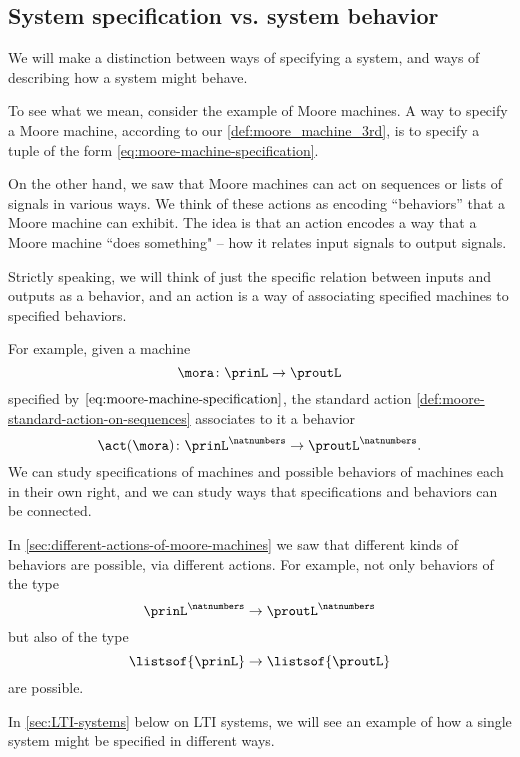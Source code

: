 
\subsection{System specification vs. system behavior}
 
We will make a distinction between ways of specifying a system, and ways of describing how a system might behave. 

To see what we mean, consider the example of Moore machines. A way to specify a Moore machine, according to our \cref{def:moore_machine_3rd}, is to specify a tuple of the form \cref{eq:moore-machine-specification}. 

On the other hand, we saw that Moore machines can act on sequences or lists of signals in various ways. We think of these actions as encoding ``behaviors'' that a Moore machine can exhibit. The idea is that an action encodes a way that a Moore machine ``does something" -- how it relates input signals to output signals. 

Strictly speaking, we will think of just the specific relation between inputs and outputs as a behavior, and an action is a way of associating specified machines to specified behaviors. 


For example, given a machine 
\begin{equation*}
\mora \colon \prinL \to \proutL
\end{equation*}
specified by $\cref{eq:moore-machine-specification}$, the standard action \cref{def:moore-standard-action-on-sequences} associates to it a behavior
\begin{equation*}
    \act(\mora) \colon {\prinL}^\natnumbers \to {\proutL}^\natnumbers.
\end{equation*}
We can study specifications of machines and possible behaviors of machines each in their own right, and we can study ways that specifications and behaviors can be connected. 

In \cref{sec:different-actions-of-moore-machines} we saw that different kinds of behaviors are possible, via different actions. For example, not only behaviors of the type
\begin{equation*}
{\prinL}^\natnumbers \to {\proutL}^\natnumbers
\end{equation*}
but also of the type
\begin{equation*}
\listsof{\prinL} \to \listsof{\proutL}
\end{equation*}
are possible. 

In \cref{sec:LTI-systems} below on LTI systems, we will see an example of how a single system might be specified in different ways.



